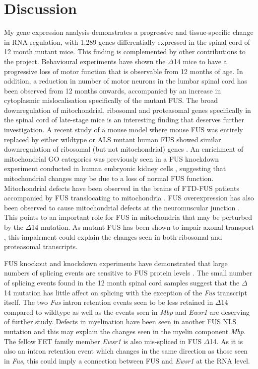 \section{Discussion}
My gene expression analysis demonstrates a progressive and tissue-specific change in RNA regulation, with 1,289 genes differentially expressed in the spinal cord of 12 month mutant mice. This finding is complemented by other contributions to the project. Behavioural experiments have shown the $\Delta$14 mice to have a progressive loss of motor function that is observable from 12 months of age. In addition, a reduction in number of motor neurons in the lumbar spinal cord has been observed from 12 months onwards, accompanied by an increase in cytoplasmic mislocalisation specifically of the mutant FUS.
The broad downregulation of mitochondrial, ribosomal and proteasomal genes specifically in the spinal cord of late-stage mice is an interesting finding that deserves further investigation. 
A recent study of a mouse model where mouse FUS was entirely replaced by either wildtype or ALS mutant human FUS showed similar downregulation of ribosomal (but not mitochondrial) genes \citep{Lopez-Erauskin2018}.
An enrichment of mitochondrial GO categories was previously seen in a FUS knockdown experiment conducted in human embryonic kidney cells  \citep{Schwartz2012}, suggesting that mitochondrial changes may be due to a loss of normal FUS function. Mitochondrial defects have been observed in the brains of FTD-FUS patients accompanied by FUS translocating to mitochondria \citep{Deng2015}. FUS overexpression has also been observed to cause mitochondrial defects at the neuromuscular junction \citep{So2018}. This points to an important role for FUS in mitochondria that may be perturbed by the $\Delta$14 mutation.
As mutant FUS has been shown to impair axonal transport \citep{Guo2017}, this impairment could explain the changes seen in both ribosomal and proteasomal transcripts.

FUS knockout and knockdown experiments have demonstrated that large numbers of splicing events are sensitive to FUS protein levels \citep{Rogelj2012,Lagier-Tourenne2012,Ishigaki2012,Honda2014,Scekic-zahirovic2016}. The small number of splicing events found in the 12 month spinal cord samples suggest that the $\Delta$14 mutation has little affect on splicing with the exception of the \textit{Fus} transcript itself. The two \textit{Fus} intron retention events seen to be less retained in $\Delta$14 compared to wildtype as well as the events seen in \textit{Mbp} and \textit{Ewsr1} are deserving of further study. Defects in myelination have been seen in another FUS NLS mutation \citep{Scekic-zahirovic2017} and this may explain the changes seen in the myelin component \textit{Mbp}. The fellow FET family member \textit{Ewsr1} is also mis-spliced in FUS $\Delta$14. As it is also an intron retention event which changes in the same direction as those seen in \textit{Fus}, this could imply a connection between FUS and \textit{Ewsr1} at the RNA level.